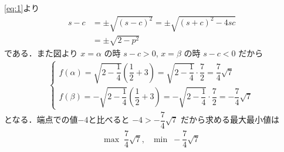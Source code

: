 \documentclass[../../main.tex]{subfiles}
\begin{document}
\cref{eq:1}より
\begin{align}
  s-c &= \pm \sqrt{(s-c)^2} = \pm \sqrt{(s+c)^2 - 4sc} \\
  &= \pm \sqrt{2-p^2}
\end{align}
である．また図より $x=\alpha$ の時 $s-c > 0$, $x=\beta$ の時 $s-c < 0$ だから
\begin{align}
  \begin{cases}
    f(\alpha) = \sqrt{2-\dfrac{1}{4}} \left( \dfrac{1}{2} + 3 \right) = \sqrt{2-\dfrac{1}{4}} \cdot \dfrac{7}{2} = \dfrac{7}{4}\sqrt{7} \\
    f(\beta) = -\sqrt{2-\dfrac{1}{4}} \left( \dfrac{1}{2} + 3 \right) = -\sqrt{2-\dfrac{1}{4}} \cdot \dfrac{7}{2} = -\dfrac{7}{4}\sqrt{7}
  \end{cases}
\end{align}
となる．端点での値$-4$と比べると $-4 > -\dfrac{7}{4}\sqrt{7}$ だから求める最大最小値は
\begin{align}
  \text{max} \;\; \dfrac{7}{4}\sqrt{7}, \quad \text{min} \;\; -\dfrac{7}{4}\sqrt{7}
\end{align}
\end{document}
